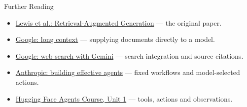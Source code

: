 \documentclass[aspectratio=169]{beamer}
\begin{document}
\begin{frame}{Further Reading}
  \begin{itemize}
    \item \href{https://arxiv.org/abs/2005.11401}{Lewis et al.: Retrieval-Augmented Generation} --- the original paper.
    \item \href{https://ai.google.dev/gemini-api/docs/long-context}{Google: long context} --- supplying documents directly to a model.
    \item \href{https://ai.google.dev/gemini-api/docs/google-search}{Google: web search with Gemini} --- search integration and source citations.
    \item \href{https://www.anthropic.com/research/building-effective-agents}{Anthropic: building effective agents} --- fixed workflows and model-selected actions.
    \item \href{https://huggingface.co/learn/agents-course/en/unit1/introduction}{Hugging Face Agents Course, Unit 1} --- tools, actions and observations.
  \end{itemize}
\end{frame}
\end{document}
